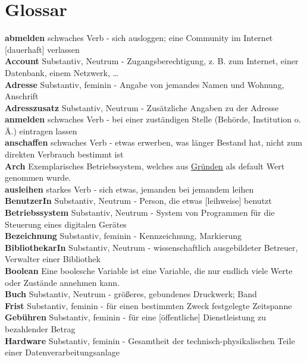 \documentclass{article}
\begin{document}
    \section*{Glossar}
    \textbf{abmelden} schwaches Verb - sich ausloggen; eine Community im Internet [dauerhaft] verlassen \\
    \textbf{Account} Substantiv, Neutrum - Zugangsberechtigung, z. B. zum Internet, einer Datenbank, einem Netzwerk, \ldots\\
    \textbf{Adresse} Substantiv, feminin - Angabe von jemandes Namen und Wohnung, Anschrift\\
    \textbf{Adresszusatz} Substantiv, Neutrum - Zusätzliche Angaben zu der Adresse\\
    \textbf{anmelden} schwaches Verb - bei einer zuständigen Stelle (Behörde, Institution o. Ä.) eintragen lassen\\
    \textbf{anschaffen} schwaches Verb - etwas erwerben, was länger Bestand hat, nicht zum direkten Verbrauch bestimmt ist\\
    \textbf{Arch} Exemplarisches Betriebssystem, welches aus \href{https://www.reddit.com/r/LinuxPorn/}{Gründen} als default Wert genommen wurde. \\
    \textbf{ausleihen} starkes Verb - sich etwas, jemanden bei jemandem leihen\\
    \textbf{BenutzerIn} Substantiv, Neutrum - Person, die etwas [leihweise] benutzt\\
    \textbf{Betriebssystem} Substantiv, Neutrum - System von Programmen für die Steuerung eines digitalen Gerätes\\
    \textbf{Bezeichnung} Substantiv, feminin - Kennzeichnung, Markierung\\
    \textbf{BibliothekarIn} Substantiv, Neutrum - wissenschaftlich ausgebildeter Betreuer, Verwalter einer Bibliothek\\
    \textbf{Boolean} Eine boolesche Variable ist eine Variable, die nur endlich viele Werte oder Zustände annehmen kann.\\
    \textbf{Buch} Substantiv, Neutrum - größeres, gebundenes Druckwerk; Band\\
    \textbf{Frist} Substantiv, feminin - für einen bestimmten Zweck festgelegte Zeitspanne\\
    \textbf{Gebühren} Substantiv, feminin - für eine [öffentliche] Dienstleistung zu bezahlender Betrag\\
    \textbf{Hardware} Substantiv, feminin - Gesamtheit der technisch-physikalischen Teile einer Datenverarbeitungsanlage\\
\end{document}
